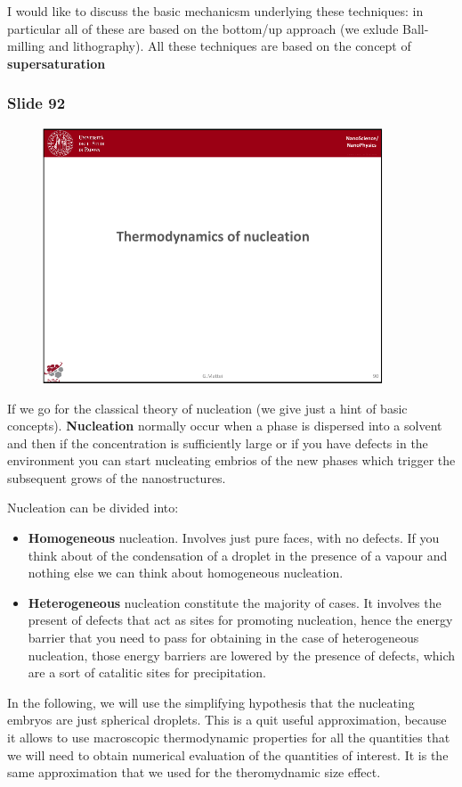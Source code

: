 \documentclass[../main/main.tex]{subfiles}
\begin{document}
I would like to discuss the basic mechanicsm underlying these techniques: in particular all of these are based on the bottom/up approach (we exlude Ball-milling and lithography). All these techniques are based on the concept of \textbf{supersaturation}

\newpage
\subsubsection{Slide 92}

\begin{figure}[h!]
\centering
\includegraphics[page=3,width=0.9\textwidth]{../lessons/pdf_file/6_lesson.pdf}
\end{figure}

If we go for the classical theory of nucleation (we give just a hint of basic concepts). \textbf{Nucleation} normally occur when a phase is dispersed into a solvent and then if the concentration is sufficiently large or if you have defects in the environment you can start nucleating embrios of the new phases which trigger the  subsequent grows of the nanostructures.

Nucleation can be divided into:
\begin{itemize}
\item \textbf{Homogeneous} nucleation. Involves just pure faces, with no defects. If you think about of the condensation of a droplet in the presence of a vapour and nothing else we can think about homogeneous nucleation.
\item \textbf{Heterogeneous} nucleation constitute the majority of cases. It involves the present of defects that act as sites for promoting nucleation, hence the energy barrier that you need to pass for obtaining in the case of heterogeneous nucleation, those energy barriers are lowered by the presence of defects, which are a sort of catalitic sites for precipitation.
\end{itemize}
In the following, we will use the simplifying hypothesis that the nucleating embryos are just spherical droplets. This is a quit useful approximation, because it allows to use macroscopic thermodynamic properties for all the quantities that we will need to obtain numerical evaluation of the quantities of interest. It is the same approximation that we used for the theromydnamic size effect.
\end{document}
